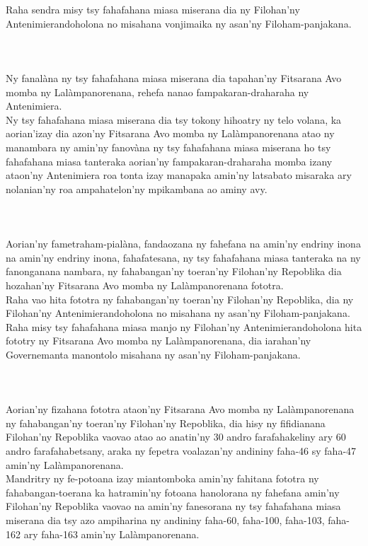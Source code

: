 \documentclass[12pt]{article}
\newcounter{laharana}
\newcommand{\andininy}[0]{
  \paragraph{%
    \NoCaseChange{%
      Andininy~\addtocounter{laharana}{1}\thelaharana.}\label{and:\thelaharana}~%
  }%
}
\begin{document}
\noindent
Raha sendra misy tsy fahafahana miasa miserana dia ny Filohan'ny
Antenimierandoholona no misahana vonjimaika ny asan'ny Filoham-panjakana.

\andininy{}Ny fanalàna ny tsy fahafahana miasa miserana dia tapahan'ny
Fitsarana Avo momba ny Lalàmpanorenana, rehefa nanao fampakaran-draharaha ny
Antenimiera.\\

\noindent
Ny tsy fahafahana miasa miserana dia tsy tokony hihoatry ny telo volana, ka
aorian'izay dia azon'ny Fitsarana Avo momba ny Lalàmpanorenana atao ny manambara
ny amin'ny fanovàna ny tsy fahafahana miasa miserana ho tsy fahafahana miasa
tanteraka aorian'ny fampakaran-draharaha momba izany ataon'ny Antenimiera roa
tonta izay manapaka amin'ny latsabato misaraka ary nolanian'ny roa
ampahatelon'ny mpikambana ao aminy avy.

\andininy{}Aorian'ny fametraham-pialàna, fandaozana ny fahefana na amin'ny
endriny inona na amin'ny endriny inona, fahafatesana, ny tsy fahafahana miasa
tanteraka na ny fanonganana nambara, ny fahabangan'ny toeran'ny Filohan'ny
Repoblika dia hozahan'ny Fitsarana Avo momba ny Lalàmpanorenana fototra.\\

\noindent
Raha vao hita fototra ny fahabangan'ny toeran'ny Filohan'ny Repoblika, dia ny
Filohan'ny Antenimierandoholona no misahana ny asan'ny Filoham-panjakana.\\

\noindent
Raha misy tsy fahafahana miasa manjo ny Filohan'ny Antenimierandoholona hita
fototry ny Fitsarana Avo momba ny Lalàmpanorenana, dia iarahan'ny Governemanta
manontolo misahana ny asan'ny Filoham-panjakana.

\andininy{}Aorian'ny fizahana fototra ataon'ny Fitsarana Avo momba ny
Lalàmpanorenana ny fahabangan'ny toeran'ny Filohan'ny Repoblika, dia hisy ny
fifidianana Filohan'ny Repoblika vaovao atao ao anatin'ny 30 andro
farafahakeliny ary 60 andro farafahabetsany, araka ny fepetra voalazan'ny
andininy faha-46 sy faha-47 amin'ny Lalàmpanorenana.\\

\noindent
Mandritry ny fe-potoana izay miantomboka amin'ny fahitana fototra ny
fahabangan-toerana ka hatramin'ny fotoana hanolorana ny fahefana amin'ny
Filohan'ny Repoblika vaovao na amin'ny fanesorana ny tsy fahafahana miasa
miserana dia tsy azo ampiharina ny andininy faha-60, faha-100, faha-103,
faha-162 ary faha-163 amin'ny Lalàmpanorenana.
\end{document}
